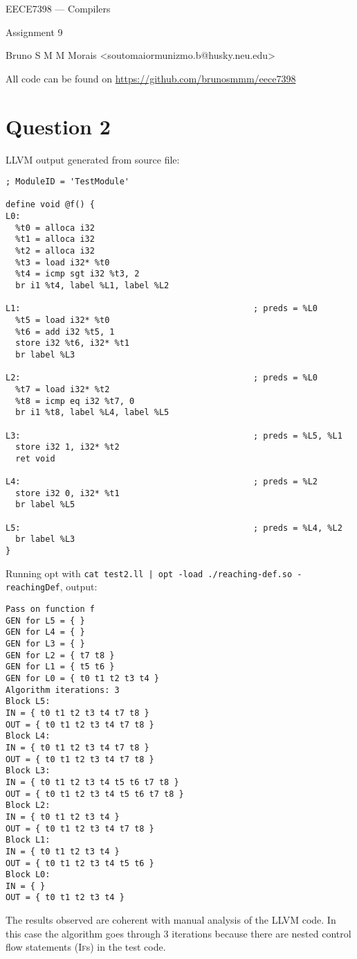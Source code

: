 \documentclass[11pt]{article}
\begin{document}
\begin{center}
\huge EECE7398 --- Compilers

Assignment 9

\vskip1cm

\normalsize\ttfamily Bruno S M M Morais <soutomaiormunizmo.b@husky.neu.edu>

All code can be found on \url{https://github.com/brunosmmm/eece7398}

\end{center}

\vskip0.5cm

\section*{Question 2}

LLVM output generated from source file:

\begin{verbatim}
; ModuleID = 'TestModule'

define void @f() {
L0:
  %t0 = alloca i32
  %t1 = alloca i32
  %t2 = alloca i32
  %t3 = load i32* %t0
  %t4 = icmp sgt i32 %t3, 2
  br i1 %t4, label %L1, label %L2

L1:                                               ; preds = %L0
  %t5 = load i32* %t0
  %t6 = add i32 %t5, 1
  store i32 %t6, i32* %t1
  br label %L3

L2:                                               ; preds = %L0
  %t7 = load i32* %t2
  %t8 = icmp eq i32 %t7, 0
  br i1 %t8, label %L4, label %L5

L3:                                               ; preds = %L5, %L1
  store i32 1, i32* %t2
  ret void

L4:                                               ; preds = %L2
  store i32 0, i32* %t1
  br label %L5

L5:                                               ; preds = %L4, %L2
  br label %L3
}
\end{verbatim}

\pagebreak

Running opt with \texttt{cat test2.ll | opt -load ./reaching-def.so -reachingDef}, output:

\begin{verbatim}
Pass on function f
GEN for L5 = { }
GEN for L4 = { }
GEN for L3 = { }
GEN for L2 = { t7 t8 }
GEN for L1 = { t5 t6 }
GEN for L0 = { t0 t1 t2 t3 t4 }
Algorithm iterations: 3
Block L5: 
IN = { t0 t1 t2 t3 t4 t7 t8 }
OUT = { t0 t1 t2 t3 t4 t7 t8 }
Block L4: 
IN = { t0 t1 t2 t3 t4 t7 t8 }
OUT = { t0 t1 t2 t3 t4 t7 t8 }
Block L3: 
IN = { t0 t1 t2 t3 t4 t5 t6 t7 t8 }
OUT = { t0 t1 t2 t3 t4 t5 t6 t7 t8 }
Block L2: 
IN = { t0 t1 t2 t3 t4 }
OUT = { t0 t1 t2 t3 t4 t7 t8 }
Block L1: 
IN = { t0 t1 t2 t3 t4 }
OUT = { t0 t1 t2 t3 t4 t5 t6 }
Block L0: 
IN = { }
OUT = { t0 t1 t2 t3 t4 }
\end{verbatim}

The results observed are coherent with manual analysis of the LLVM code. In this case the algorithm goes through 3 iterations because there are nested control flow statements (\textsc{If}s) in the test code.
\end{document}
